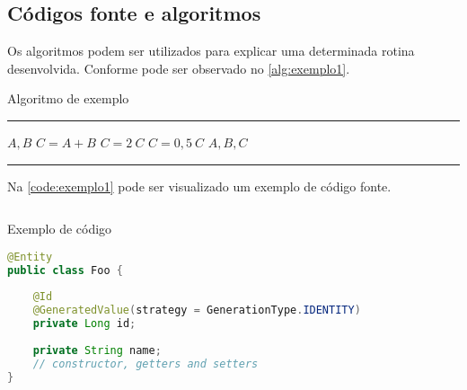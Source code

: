 \subsection{Códigos fonte e algoritmos}\label{subsec:algoritimos}

Os algoritmos podem ser utilizados para explicar uma determinada rotina desenvolvida. Conforme pode ser observado no \autoref{alg:exemplo1}.

\begin{algorithm}[htb]%
  \caption{Algoritmo de exemplo}%
  \label{alg:exemplo1}%
  \hrule
  \begin{algorithmic}[1]%
    \ENSURE $A, B$
    \STATE $C = A + B$
    \STATE $C = 2 \ C$
    \ELSE
    \STATE $C = 0,5 \ C$
    \ENDIF
    \PRINT $A, B, C$
  \end{algorithmic}
  \hrule
  \fonte{}%
\end{algorithm}

\lipsum[1]

\lipsum[1]

Na \autoref{code:exemplo1} pode ser visualizado um exemplo de código fonte.

\begin{sourcecode}[htb]
  \caption{\label{code:exemplo1}Exemplo de código}
  \begin{lstlisting}[frame=single, language=Java]
@Entity
public class Foo {
 
    @Id
    @GeneratedValue(strategy = GenerationType.IDENTITY)
    private Long id;
 
    private String name;
    // constructor, getters and setters
}
\end{lstlisting}
  \fonte{}
\end{sourcecode}

